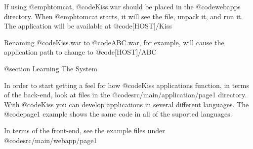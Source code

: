 If using @emph{tomcat}, @code{Kiss.war} should be placed in the
@code{webapps} directory.  When @emph{tomcat} starts, it will see the
file, unpack it, and run it.  The application will be available at
@code{[HOST]/Kiss}

Renaming @code{Kiss.war} to @code{ABC.war}, for example, will cause
the application path to change to @code{[HOST]/ABC}

@section Learning The System

In order to start getting a feel for how @code{Kiss} applications
function, in terms of the back-end, look at files in the
@code{src/main/application/page1} directory.  With @code{Kiss} you can
develop applications in several different languages.  The @code{page1}
example shows the same code in all of the suported languages.

In terms of the front-end, see the example files under @code{src/main/webapp/page1}
